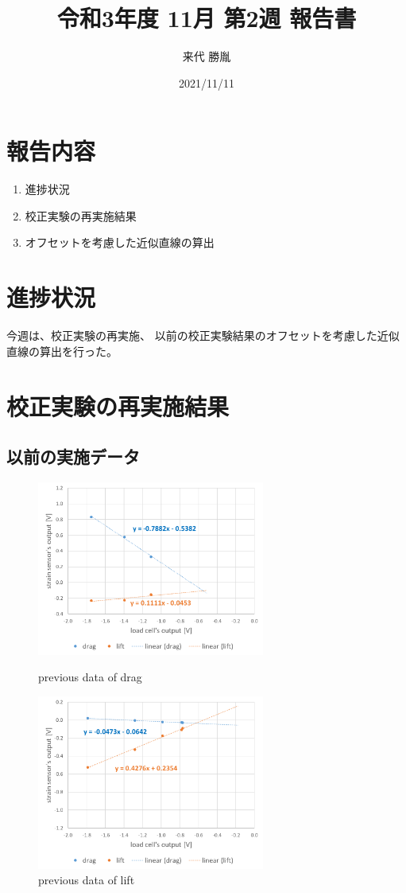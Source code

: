 \documentclass[twocolumn,a4j]{jsarticle}
\author{来代 勝胤}
\title{令和3年度 11月 第2週 報告書}
\date{2021/11/11}
\begin{document}
\columnseprule=0.1mm

\maketitle
\section*{報告内容}
\begin{enumerate}[1.]
    \item 進捗状況
    \item 校正実験の再実施結果
    \item オフセットを考慮した近似直線の算出
\end{enumerate}

\section{進捗状況}
今週は、校正実験の再実施、
以前の校正実験結果のオフセットを考慮した近似直線の算出を行った。

\section{校正実験の再実施結果}
\subsection{以前の実施データ}
\begin{figure}[htbp]
    \footnotesize
    \begin{center}
        \includegraphics[width=75mm]{../images/graph_21119_drag_previous.png}
        \caption{previous data of drag}
        \includegraphics[width=75mm]{../images/graph_21119_lift_previous.png}
        \caption{previous data of lift}
    \end{center}
\end{figure}
\end{document}
